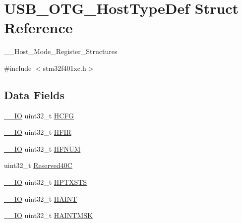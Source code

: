 \hypertarget{struct_u_s_b___o_t_g___host_type_def}{}\section{U\+S\+B\+\_\+\+O\+T\+G\+\_\+\+Host\+Type\+Def Struct Reference}
\label{struct_u_s_b___o_t_g___host_type_def}


\+\_\+\+\_\+\+Host\+\_\+\+Mode\+\_\+\+Register\+\_\+\+Structures  




{\ttfamily \#include $<$stm32f401xc.\+h$>$}

\subsection*{Data Fields}
\begin{DoxyCompactItemize}
\item 
\hyperlink{core__sc300_8h_aec43007d9998a0a0e01faede4133d6be}{\+\_\+\+\_\+\+IO} uint32\+\_\+t \hyperlink{struct_u_s_b___o_t_g___host_type_def_aa15bc4ab9217b295560dbda2235c745a}{H\+C\+FG}
\item 
\hyperlink{core__sc300_8h_aec43007d9998a0a0e01faede4133d6be}{\+\_\+\+\_\+\+IO} uint32\+\_\+t \hyperlink{struct_u_s_b___o_t_g___host_type_def_a0a6f11662e44ad485cc869f49e5aa9c9}{H\+F\+IR}
\item 
\hyperlink{core__sc300_8h_aec43007d9998a0a0e01faede4133d6be}{\+\_\+\+\_\+\+IO} uint32\+\_\+t \hyperlink{struct_u_s_b___o_t_g___host_type_def_a6a141fc0dab9ee8930465a2da604420f}{H\+F\+N\+UM}
\item 
uint32\+\_\+t \hyperlink{struct_u_s_b___o_t_g___host_type_def_af66e42cdb83dc2eb156dfbbf42890f79}{Reserved40C}
\item 
\hyperlink{core__sc300_8h_aec43007d9998a0a0e01faede4133d6be}{\+\_\+\+\_\+\+IO} uint32\+\_\+t \hyperlink{struct_u_s_b___o_t_g___host_type_def_a3903a00940c32a9f09889e08881e7a6a}{H\+P\+T\+X\+S\+TS}
\item 
\hyperlink{core__sc300_8h_aec43007d9998a0a0e01faede4133d6be}{\+\_\+\+\_\+\+IO} uint32\+\_\+t \hyperlink{struct_u_s_b___o_t_g___host_type_def_a9fb9e43255829e50b9e5416d58ae11be}{H\+A\+I\+NT}
\item 
\hyperlink{core__sc300_8h_aec43007d9998a0a0e01faede4133d6be}{\+\_\+\+\_\+\+IO} uint32\+\_\+t \hyperlink{struct_u_s_b___o_t_g___host_type_def_a4d431ac4a59cbb89ed82a6c6cf9dfc39}{H\+A\+I\+N\+T\+M\+SK}
\end{DoxyCompactItemize}


